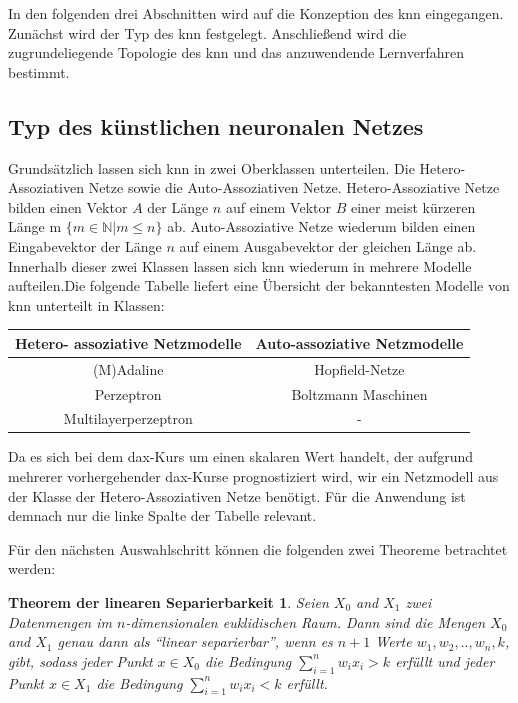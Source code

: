 In den folgenden drei Abschnitten wird auf die Konzeption des \ac{knn} eingegangen. Zunächst wird der Typ des \ac{knn} festgelegt. Anschließend wird die zugrundeliegende Topologie des \ac{knn} und das anzuwendende Lernverfahren bestimmt.

\subsection{Typ des künstlichen neuronalen Netzes}
\label{subsection:Typ des künstlichen neuronalen Netzes}

Grundsätzlich lassen sich \ac{knn} in zwei Oberklassen unterteilen. Die Hetero-Assoziativen Netze sowie die Auto-Assoziativen Netze. Hetero-Assoziative Netze bilden einen Vektor $A$ der Länge $n$ auf einem Vektor $B$ einer meist kürzeren Länge m $\{m \in \mathbb{N} | m \le n\}$ ab. Auto-Assoziative Netze wiederum bilden einen Eingabevektor der Länge $n$ auf einem Ausgabevektor der gleichen Länge ab. Innerhalb dieser zwei Klassen lassen sich \ac{knn} wiederum in mehrere Modelle aufteilen.Die folgende Tabelle liefert eine Übersicht der bekanntesten Modelle von \ac{knn} unterteilt in Klassen:

\begin{center}
\begin{tabular}{|c|c|}
\hline 
 Hetero- assoziative Netzmodelle & Auto-assoziative Netzmodelle \\ 
\hline 
(M)Adaline & Hopfield-Netze \\ 
\hline  
Perzeptron &  Boltzmann Maschinen \\ 
\hline 
Multilayerperzeptron & - \\ 
\hline 
\end{tabular} 
\end{center}

Da es sich bei dem \ac{dax}-Kurs um einen skalaren Wert handelt, der aufgrund mehrerer vorhergehender \ac{dax}-Kurse prognostiziert wird, wir ein Netzmodell aus der Klasse der Hetero-Assoziativen Netze benötigt. Für die Anwendung ist demnach nur die linke Spalte der Tabelle relevant. 

Für den nächsten Auswahlschritt können die folgenden zwei Theoreme betrachtet werden:

\newtheorem*{theorem2*}{Theorem der linearen Separierbarkeit}
\begin{theorem2*}
Seien $X_{0}$ and $X_{1}$ zwei Datenmengen im $n$-dimensionalen euklidischen Raum. Dann sind die Mengen $X_{0}$ and $X_{1}$ genau dann als "`linear separierbar"', wenn es  $n+1$ Werte $w_{1}, w_{2},..,w_{n}, k$, gibt, sodass jeder Punkt  $x \in X_{0}$ die Bedingung $\sum^{n}_{i=1} w_{i}x_{i} > k$ erfüllt und jeder Punkt $x \in X_{1}$ die Bedingung $\sum^{n}_{i=1} w_{i}x_{i} < k$ erfüllt.
\end{theorem2*}

